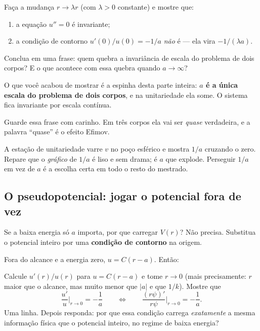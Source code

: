 \documentclass[11pt,a4paper]{article}
\begin{document}
\begin{suavez}
Faça a mudança $r \to \lambda r$ (com $\lambda>0$ constante) e mostre que:
\begin{enumerate}[label=(\alph*), itemsep=2pt]
\item a equação $u''=0$ é invariante;
\item a condição de contorno $u'(0)/u(0) = -1/a$ \emph{não} é --- ela vira
      $-1/(\lambda a)$.
\end{enumerate}
Conclua em uma frase: quem quebra a invariância de escala do problema de dois corpos?
E o que acontece com essa quebra quando $a\to\infty$?

\vspace{2.2cm}
\hrulefill
\end{suavez}

O que você acabou de mostrar é a espinha desta parte inteira: \textbf{$a$ é a única
escala do problema de dois corpos}, e na unitariedade ela some. O sistema fica
invariante por escala contínua.

Guarde essa frase com carinho. Em três corpos ela vai ser \emph{quase} verdadeira, e
a palavra ``quase'' é o efeito Efimov.

\begin{ponte}
A estação de unitariedade varre $v$ no poço esférico e mostra $1/a$ cruzando o zero.
Repare que o \emph{gráfico} de $1/a$ é liso e sem drama; é $a$ que explode. Perseguir
$1/a$ em vez de $a$ é a escolha certa em todo o resto do mestrado.
\end{ponte}

\subsection{O pseudopotencial: jogar o potencial fora de vez}

Se a baixa energia só $a$ importa, por que carregar $V(r)$? Não precisa. Substitua o
potencial inteiro por uma \textbf{condição de contorno} na origem.

Fora do alcance e a energia zero, $u = C(r-a)$. Então:

\begin{suavez}
Calcule $u'(r)/u(r)$ para $u = C(r-a)$ e tome $r\to 0$ (mais precisamente:
$r$ maior que o alcance, mas muito menor que $|a|$ e que $1/k$). Mostre que
\[
\frac{u'}{u}\bigg|_{r\to 0} = -\frac{1}{a}
\qquad\Longleftrightarrow\qquad
\frac{(r\psi)'}{r\psi}\bigg|_{r\to 0} = -\frac{1}{a}.
\]
Uma linha. Depois responda: por que essa condição carrega \emph{exatamente} a mesma
informação física que o potencial inteiro, no regime de baixa energia?

\vspace{2.0cm}
\hrulefill
\end{suavez}
\end{document}
